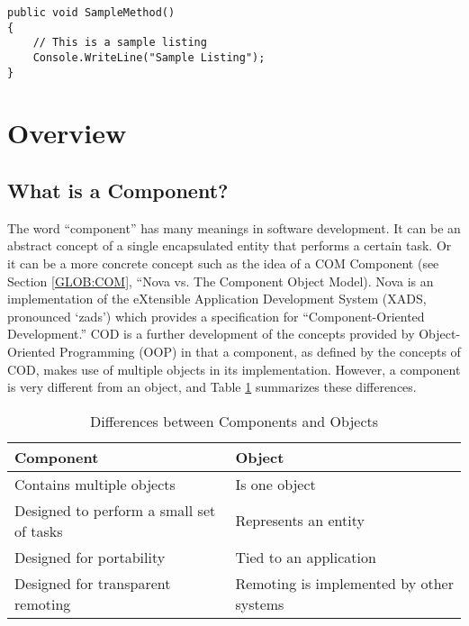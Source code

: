 \documentclass[a4paper,12pt]{article}
\newenvironment{tblcont}[2]{\begin{center}\begin{tabular}{#1}\hline #2\\
	\hline}{\hline\end{tabular}\end{center}}
\begin{document}
\begin{lstlisting}[float,caption={A Sample Listing},label={LST:Intro:Sample}]
public void SampleMethod()
{
	// This is a sample listing
	Console.WriteLine("Sample Listing");
}
\end{lstlisting}

\section{Overview}
\label{SEC:OVR}

\subsection{What is a Component?}
\label{SEC:OVR:Comp}
The word ``component'' has many meanings in software development. It can be an abstract concept of a single encapsulated entity that performs a certain task. Or it can be a more concrete concept such as the idea of a COM Component (see Section \ref{GLOB:COM}, ``Nova vs. The Component Object Model). Nova is an implementation of the eXtensible Application Development System (XADS, pronounced `zads') which provides a specification for ``Component-Oriented Development.'' COD is a further development of the concepts provided by Object-Oriented Programming (OOP) in that a component, as defined by the concepts of COD, makes use of multiple objects in its implementation. However, a component is very different from an object, and Table \ref{TAB:CvO} summarizes these differences.

\begin{table}
\label{TAB:CvO}
\begin{tblcont}{| l | l |}{\textbf{Component} & \textbf{Object}}
Contains multiple objects & Is one object\\
\hline
Designed to perform a small set of tasks & Represents an entity\\
\hline
Designed for portability & Tied to an application\\
\hline
Designed for transparent remoting & Remoting is implemented by other systems\\
\end{tblcont}
\caption{Differences between Components and Objects}
\end{table}
\end{document}
